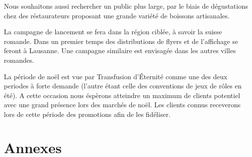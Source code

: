 \documentclass[10pt,a4paper]{article}
\newcommand{\tde}{Transfusion d'Éternité}
\begin{document}
Nous souhaitons aussi rechercher un public plus large, par le biais de dégustations chez des réstaurateurs proposant une grande variété de boissons artisanales.

La campagne de lancement se fera dans la région ciblée, à savoir la suisse romande.
Dans un premier temps des distributions de flyers et de l'affichage se feront à Lausanne.
Une campagne similaire est envisagée dans les autres villes romandes.

La période de noël est vue par \tde{} comme une des deux periodes à forte demande (l'autre étant celle des conventions de jeux de rôles en été).
A cette occasion nous éspèrons atteindre un maximum de clients potentiel avec une grand présence lors des marchés de noël.
Les clients connus receverons lors de cette période des promotions afin de les fidéliser.
\section{Annexes}
\end{document}
